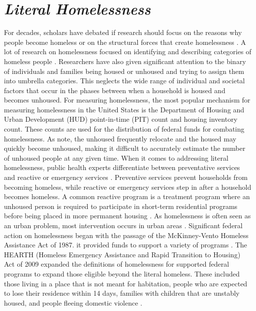 \section{\textit{Literal Homelessness}}
For decades, scholars have debated if research should focus on the reasons why people become homeless or  on the structural forces that create homelessness \citep{shlay_social_2003}. A lot of research on homelessness focused on identifying and describing categories of homeless people \citep{lee_homelessness_2021}. Researchers have also given significant attention to the binary of individuals and families being housed or unhoused and trying to assign them into umbrella categories. This neglects the wide range of individual and societal factors that occur in the phases between when a household is housed and becomes unhoused. For measuring homelessness, the most popular mechanism for measuring homelessness in the United States is the Department of Housing and Urban Development (HUD) point-in-time (PIT) count and housing inventory count. These counts are used for the distribution of federal funds for combating homelessness. As \citet{agans_enumerating_2014}  note, the unhoused frequently relocate and the housed may quickly become unhoused, making it difficult to accurately estimate the number of unhoused people at any given time. When it comes to addressing literal homelessness, public health experts differentiate between preventative services and reactive or emergency services \citep{oregan_how_2021}. Preventive services prevent households from becoming homeless, while reactive or emergency services step in after a household becomes homeless. A common reactive program is a treatment program where an unhoused person is required to participate in short-term residential programs before being placed in more permanent housing \citep{evans_reducing_2019}. As homelessness is often seen as an urban problem, most intervention occurs in urban areas \citep{gleason_using_2021}. Significant federal action on homelessness began with the passage of the McKinney-Vento Homeless Assistance Act of 1987. it provided funds to support a variety of programs  \citep{evans_reducing_2019}. The HEARTH (Homeless Emergency Assistance and Rapid Transition to Housing) Act of 2009 expanded the definitions of homelessness for supported federal programs to expand those eligible beyond the literal homeless. These included those living in a place that is not meant for habitation, people who are expected to lose their residence within 14 days, families with children that are unstably housed, and people fleeing domestic violence  \citep{evans_reducing_2019}. %


